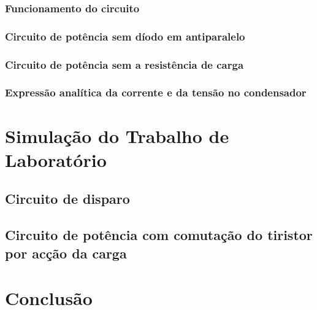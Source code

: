 \documentclass[a4paper,11pt]{article}
\numberwithin{equation}{section}
\begin{document}
\subsubsection{Funcionamento do circuito}

\subsubsection{Circuito de potência sem díodo em antiparalelo}

\subsubsection{Circuito de potência sem a resistência de carga}

\subsubsection{Expressão analítica da corrente e da tensão no condensador}

\pagebreak

\section{Simulação do Trabalho de Laboratório}

\subsection{Circuito de disparo}

\subsection{Circuito de potência com comutação do tiristor por acção da carga}

\pagebreak

\section{Conclusão}
\end{document}
